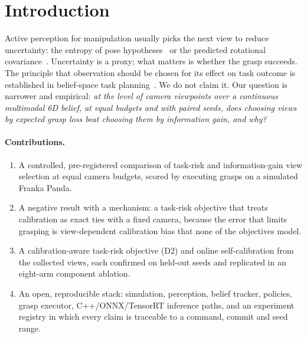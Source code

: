 \documentclass[10pt,twocolumn]{article}
\begin{document}
\section{Introduction}
Active perception for manipulation usually picks the next view to reduce uncertainty: the entropy
of pose hypotheses~\cite{liu2025activepose} or the predicted rotational
covariance~\cite{jin2025poseflow}. Uncertainty is a proxy; what matters is whether the grasp
succeeds. The principle that observation should be chosen for its effect on task outcome is
established in belief-space task planning~\cite{curtis2024potamp}. We do not claim it. Our
question is narrower and empirical: \emph{at the level of camera viewpoints over a continuous
multimodal 6D belief, at equal budgets and with paired seeds, does choosing views by expected
grasp loss beat choosing them by information gain, and why?}

\paragraph{Contributions.}
\begin{enumerate}
\item A controlled, pre-registered comparison of task-risk and information-gain view selection at
equal camera budgets, scored by executing grasps on a simulated Franka Panda.
\item A negative result with a mechanism: a task-risk objective that treats calibration as exact
ties with a fixed camera, because the error that limits grasping is view-dependent calibration
bias that none of the objectives model.
\item A calibration-aware task-risk objective (D2) and online self-calibration from the
collected views, each confirmed on held-out seeds and replicated in an eight-arm component ablation.
\item An open, reproducible stack: simulation, perception, belief tracker, policies, grasp
executor, C++/ONNX/TensorRT inference paths, and an experiment registry in which every claim is
traceable to a command, commit and seed range.
\end{enumerate}
\end{document}

